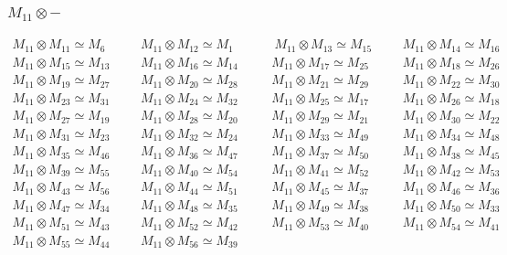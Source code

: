 \subsubsection{$M_11\otimes -$}
\begin{align*}
M_{11} \otimes M_{11} \simeq M_{6} &&& M_{11} \otimes M_{12} \simeq M_{1} &&& \
M_{11} \otimes M_{13} \simeq M_{15} &&& M_{11} \otimes M_{14} \simeq M_{16}\\
M_{11} \otimes M_{15} \simeq M_{13} &&& M_{11} \otimes M_{16} \simeq M_{14} &&\
& M_{11} \otimes M_{17} \simeq M_{25} &&& M_{11} \otimes M_{18} \simeq M_{26}\
\\
M_{11} \otimes M_{19} \simeq M_{27} &&& M_{11} \otimes M_{20} \simeq M_{28} &&\
& M_{11} \otimes M_{21} \simeq M_{29} &&& M_{11} \otimes M_{22} \simeq M_{30}\
\\
M_{11} \otimes M_{23} \simeq M_{31} &&& M_{11} \otimes M_{24} \simeq M_{32} &&\
& M_{11} \otimes M_{25} \simeq M_{17} &&& M_{11} \otimes M_{26} \simeq M_{18}\
\\
M_{11} \otimes M_{27} \simeq M_{19} &&& M_{11} \otimes M_{28} \simeq M_{20} &&\
& M_{11} \otimes M_{29} \simeq M_{21} &&& M_{11} \otimes M_{30} \simeq M_{22}\
\\
M_{11} \otimes M_{31} \simeq M_{23} &&& M_{11} \otimes M_{32} \simeq M_{24} &&\
& M_{11} \otimes M_{33} \simeq M_{49} &&& M_{11} \otimes M_{34} \simeq M_{48}\
\\
M_{11} \otimes M_{35} \simeq M_{46} &&& M_{11} \otimes M_{36} \simeq M_{47} &&\
& M_{11} \otimes M_{37} \simeq M_{50} &&& M_{11} \otimes M_{38} \simeq M_{45}\
\\
M_{11} \otimes M_{39} \simeq M_{55} &&& M_{11} \otimes M_{40} \simeq M_{54} &&\
& M_{11} \otimes M_{41} \simeq M_{52} &&& M_{11} \otimes M_{42} \simeq M_{53}\
\\
M_{11} \otimes M_{43} \simeq M_{56} &&& M_{11} \otimes M_{44} \simeq M_{51} &&\
& M_{11} \otimes M_{45} \simeq M_{37} &&& M_{11} \otimes M_{46} \simeq M_{36}\
\\
M_{11} \otimes M_{47} \simeq M_{34} &&& M_{11} \otimes M_{48} \simeq M_{35} &&\
& M_{11} \otimes M_{49} \simeq M_{38} &&& M_{11} \otimes M_{50} \simeq M_{33}\
\\
M_{11} \otimes M_{51} \simeq M_{43} &&& M_{11} \otimes M_{52} \simeq M_{42} &&\
& M_{11} \otimes M_{53} \simeq M_{40} &&& M_{11} \otimes M_{54} \simeq M_{41}\
\\
M_{11} \otimes M_{55} \simeq M_{44} &&& M_{11} \otimes M_{56} \simeq M_{39}\\
\end{align*}

